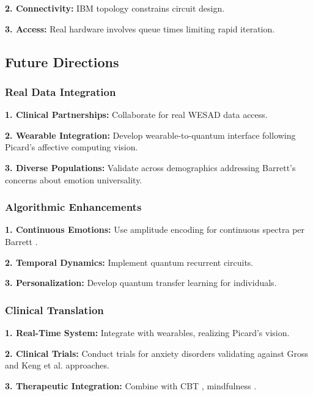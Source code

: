 \documentclass[11pt,letterpaper]{article}
\begin{document}
\textbf{2. Connectivity:} IBM topology constrains circuit design.

\textbf{3. Access:} Real hardware involves queue times limiting rapid iteration.

\subsection{Future Directions}

\subsubsection{Real Data Integration}

\textbf{1. Clinical Partnerships:} Collaborate for real WESAD data \cite{schmidt2018introducing} access.

\textbf{2. Wearable Integration:} Develop wearable-to-quantum interface following Picard's \cite{picard2000affective} affective computing vision.

\textbf{3. Diverse Populations:} Validate across demographics addressing Barrett's \cite{barrett2017emotions} concerns about emotion universality.

\subsubsection{Algorithmic Enhancements}

\textbf{1. Continuous Emotions:} Use amplitude encoding for continuous spectra per Barrett \cite{barrett2017emotions}.

\textbf{2. Temporal Dynamics:} Implement quantum recurrent circuits.

\textbf{3. Personalization:} Develop quantum transfer learning for individuals.

\subsubsection{Clinical Translation}

\textbf{1. Real-Time System:} Integrate with wearables, realizing Picard's \cite{picard2000affective} vision.

\textbf{2. Clinical Trials:} Conduct trials for anxiety disorders validating against Gross \cite{gross1998antecedent} and Keng et al. \cite{keng2011effect} approaches.

\textbf{3. Therapeutic Integration:} Combine with CBT \cite{gross1998antecedent}, mindfulness \cite{keng2011effect}.
\end{document}
